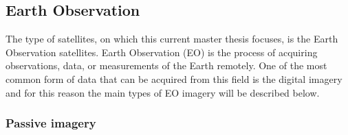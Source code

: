 \bigskip
\subsection{Earth Observation}
\label{EO}
\bigskip

The type of satellites, on which this current master thesis focuses, is the Earth Observation satellites. Earth Observation (EO) is the process of acquiring observations, data, or measurements of the Earth remotely. One of the most common form of data that can be acquired from this field is the digital imagery and for this reason the main types of EO imagery will be described below. \cite{ESA EO}

\bigskip
\subsubsection{Passive imagery}
\bigskip

